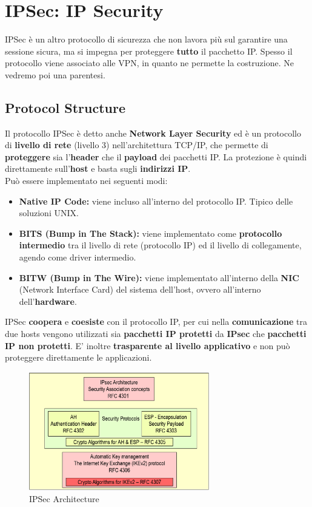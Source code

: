 \chapter{IPSec: IP Security}
IPSec è un altro protocollo di sicurezza che non lavora più sul garantire una sessione sicura, ma si impegna per proteggere \textbf{tutto} il pacchetto IP. Spesso il protocollo viene associato alle VPN, in quanto ne permette la costruzione. Ne vedremo poi una parentesi.
\section{Protocol Structure}
Il protocollo IPSec è detto anche \textbf{Network Layer Security} ed è un protocollo di \textbf{livello di rete} (livello 3) nell'architettura TCP/IP, che permette di \textbf{proteggere} sia l'\textbf{header} che il \textbf{payload} dei pacchetti IP. La protezione è quindi direttamente sull'\textbf{host} e basta sugli \textbf{indirizzi IP}.\\
Può essere implementato nei seguenti modi:
\begin{theorem}
\noindent\begin{itemize}
    \item \textbf{Native IP Code:}  viene incluso all'interno del protocollo IP. Tipico delle soluzioni UNIX.
    \item \textbf{BITS (Bump in The Stack):} viene implementato come \textbf{protocollo intermedio} tra il livello di rete (protocollo IP) ed il livello di collegamente, agendo come driver intermedio.
    \item \textbf{BITW (Bump in The Wire):} viene implementato all'interno della \textbf{NIC} (Network Interface Card) del sistema dell'host, ovvero all'interno dell'\textbf{hardware}.
\end{itemize}
\end{theorem}
\begin{remark}
IPSec \textbf{coopera} e \textbf{coesiste} con il protocollo IP, per cui nella \textbf{comunicazione} tra due hosts vengono utilizzati sia \textbf{pacchetti IP protetti} da \textbf{IPsec} che \textbf{pacchetti IP non protetti}. E' inoltre \textbf{trasparente al livello applicativo} e non può proteggere direttamente le applicazioni.
\end{remark}
\begin{figure}[h]
    \centering
    \includegraphics[width=0.7\textwidth]{image/ipsec.png}
    \caption{IPSec Architecture}
    \label{fig:ipsecarc}
\end{figure}

